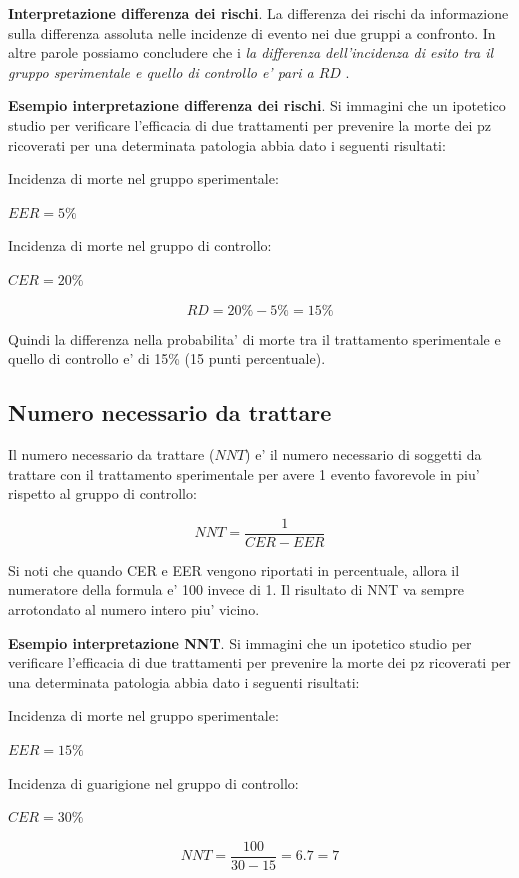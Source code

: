 \documentclass[]{book}
\begin{document}
\textbf{Interpretazione differenza dei rischi}. La differenza dei rischi da informazione sulla differenza assoluta nelle incidenze di evento nei due gruppi a confronto. In altre parole possiamo concludere che i \emph{la differenza dell'incidenza di esito tra il gruppo sperimentale e quello di controllo e' pari a \(RD\) }.

\textbf{Esempio interpretazione differenza dei rischi}. Si immagini che un ipotetico studio per verificare l'efficacia di due trattamenti per prevenire la morte dei pz ricoverati per una determinata patologia abbia dato i seguenti risultati:

Incidenza di morte nel gruppo sperimentale:

\(EER = 5\%\)

Incidenza di morte nel gruppo di controllo:

\(CER= 20\%\)

\[RD = 20\%-5\% = 15\%\]

Quindi la differenza nella probabilita' di morte tra il trattamento sperimentale e quello di controllo e' di 15\% (15 punti percentuale).

\hypertarget{numero-necessario-da-trattare}{%
\subsection{Numero necessario da trattare}\label{numero-necessario-da-trattare}}

Il numero necessario da trattare (\(NNT\)) e' il numero necessario di soggetti da trattare con il trattamento sperimentale per avere 1 evento favorevole in piu' rispetto al gruppo di controllo:

\[ NNT = \frac{1}{ CER -EER}\]

Si noti che quando CER e EER vengono riportati in percentuale, allora il numeratore della formula e' 100 invece di 1. Il risultato di NNT va sempre arrotondato al numero intero piu' vicino.

\textbf{Esempio interpretazione NNT}. Si immagini che un ipotetico studio per verificare l'efficacia di due trattamenti per prevenire la morte dei pz ricoverati per una determinata patologia abbia dato i seguenti risultati:

Incidenza di morte nel gruppo sperimentale:

\(EER = 15\%\)

Incidenza di guarigione nel gruppo di controllo:

\(CER= 30\%\)

\[NNT = \frac{100}{30-15} = 6.7 = 7\]
\end{document}
